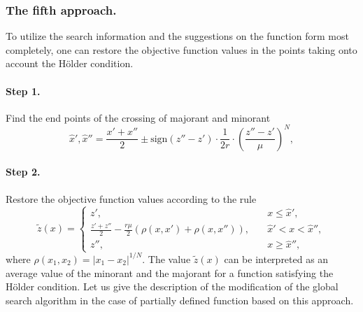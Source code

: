\documentclass[runningheads]{llncs}
\begin{document}
\subsubsection{The fifth approach.} To utilize the search information and the suggestions on the function form most completely, one can restore the objective function values in the points taking onto account the H{\"o}lder condition.
\paragraph{Step 1.} Find the end points of the crossing of majorant and minorant
\begin{equation}\label{eq18} 
\hat{x}',\hat{x}''=\frac {x'+x''}{2}\pm \text{sign}(z''-z')\cdot \frac {1}{2r} \cdot {\left(\frac {z''-z'}{\mu}\right)}^N,
\end{equation}
\paragraph{Step 2.} Restore the objective function values according to the rule
\begin{equation}\label{eq19} 
\tilde{z}(x)=
  \begin{cases}
    z', & {\quad x \leq \hat{x}',}\\
    \frac {z'+z''}{2}- \frac {r \mu}{2} (\rho(x,x')  + \rho(x,x'')), & {\quad \hat{x}' < x < \hat{x}'',}\\
    z'',  & {\quad x \geq \hat{x}'',}
  \end{cases}
\end{equation}
where $\rho(x_1,x_2) =  |x_1 - x_2|^{1/N}$.
The value $\tilde{z}(x)$ can be interpreted as an average value of the minorant and the majorant for a function satisfying the H{\"o}lder condition. Let us give the description of the modification of the global search algorithm in the case of partially defined function based on this approach.
\end{document}
